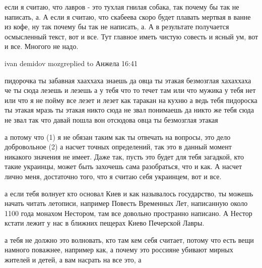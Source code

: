  
 
 
 
 

если я считаю, что лавров - это тухлая гнилая собака, так почему бы так не
написать, а. А если я считаю, что скабеева скоро будет плавать мертвая в ванне
из кофе, ну так почему бы так не написать, а. А в результате получается
осмысленный текст, вот и все. Тут главное иметь чистую совесть и ясный ум, вот
и все. Многого не надо.

ivan demidov mozgreplied to Анжела
16:41

пидорочка ты забавная хааххаха знаешь да овца ты этакая безмозглая хахаххаха че
ты сюда лезешь и лезешь а у тебя что то течет там или что мужика у тебя нет или
что я не пойму все лезет и лезет как таракан на кухню а ведь тебя пидороска ты
этакая мразь ты этакая никто сюда не звал понимаешь да никто же тебя сюда не
звал так что давай пошла вон отсюдова овца ты безмозглая этакая




а потому что (1) я не обязан таким как ты отвечать на вопросы, это дело
добровольное (2) а насчет точных определений, так это в данный момент никакого
значения не имеет. Даже так, пусть это будет для тебя загадкой, кто такие
украинцы, может быть захочешь сама разобраться, что и как. А насчет лично меня,
достаточно того, что я считаю себя украинцем, вот и все.

а если тебя волнует кто основал Киев и как называлось государство, ты можешь
начать читать летописи, например Повесть Временных Лет, написанную около 1100
года монахом Нестором, там все довольно пространно написано. А Нестор кстати
лежит у нас в ближних пещерах Киево Печерской Лавры.

а тебя не должно это волновать, кто там кем себя считает, потому что есть вещи
намного поважнее, например как, а почему это россияне убивают мирных жителей и
детей, а вам насрать на все это, а

